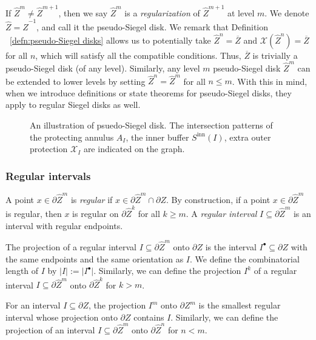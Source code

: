 \documentclass[11pt, reqno]{amsart}
\newcommand{\incfig}[1]{%
    \def\svgwidth{\columnwidth}
    {#1.pdf_tex}
}
\numberwithin{equation}{section}
\theoremstyle{plain}
\theoremstyle{theorem}
\theoremstyle{plain}
\theoremstyle{definition}
\numberwithin{figure}{section}
\newcommand\XX{\mathcal{X}}
\newcommand{\wZ}{{\widehat Z}}
\newcommand\inn{{\operatorname{inn}}}
\begin{document}
If $\widehat Z^m \neq \widehat Z^{m+1}$, then we say $\widehat Z^m$ is a {\em regularization} of $\widehat Z^{m+1}$ at level $m$.
We denote $\widehat Z = \widehat Z^{-1}$, and call it the pseudo-Siegel disk. We remark that Definition ~\ref{defn:pseudo-Siegel disks} allows us to potentially take $\widehat Z^n = \overline{Z}$ and $\XX(\wZ^n)=\overline{Z}$ for all $n$, which will satisfy all the compatible conditions.
Thus, $\overline{Z}$ is trivially a pseudo-Siegel disk (of any level). Similarly, any level $m$ pseudo-Siegel disk $\widehat Z^m$ can be extended to lower levels by setting $\widehat Z^n = \widehat Z^m$ for all $n \leq m$.
With this in mind, when we introduce definitions or state theorems for pseudo-Siegel disks, they apply to regular Siegel disks as well.


\begin{figure}[ht]
  \centering
  \resizebox{\linewidth}{!}{
  \incfig{CD}
  }
  \caption{An illustration of psuedo-Siegel disk. 
  The intersection patterns of the protecting annulus $A_I$, the inner buffer $S^{\inn}(I)$, extra outer protection $\XX_I$ are indicated on the graph.}
  \label{fig:CD}
\end{figure}


\subsubsection{Regular intervals}
A point $x\in \partial \widehat Z^m$ is {\em regular} if $x\in \partial \widehat Z^m \cap \partial Z$.
By construction, if a point $x\in\partial \widehat Z^m$ is regular, then $x$ is regular on $\partial \widehat Z^k$ for all $k\geq m$.
A {\em regular interval} $I \subseteq \partial\widehat Z^m$ is an interval with regular endpoints.

The projection of a regular interval $I \subseteq \partial \widehat Z^m$ onto $\partial Z$ is the interval $I^\bullet \subseteq \partial Z$ with the same endpoints and the same orientation as $I$.
We define the combinatorial length of $I$ by $\vert I \vert := \vert I^\bullet \vert$. 
Similarly, we can define the projection $I^k$ of a regular interval $I \subseteq \partial \widehat Z^m$ onto $\partial \widehat Z^k$ for $k > m$.\

For an interval $I \subseteq \partial Z$, the projection $I^m$ onto $\partial Z^m$ is the smallest regular interval whose projection onto $\partial Z$ contains $I$.
Similarly, we can define the projection of an interval $I \subseteq \partial \widehat Z^m$ onto $\partial \widehat Z^n$ for $n < m$.
\end{document}
